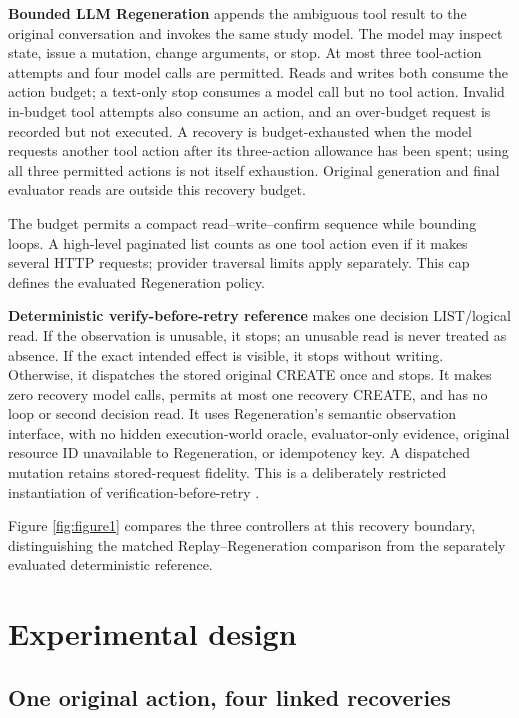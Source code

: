 \documentclass[conference]{IEEEtran}
\begin{document}
\textbf{Bounded LLM Regeneration} appends the ambiguous tool result to the original conversation and invokes the same study model. The model may inspect state, issue a mutation, change arguments, or stop. At most three tool-action attempts and four model calls are permitted. Reads and writes both consume the action budget; a text-only stop consumes a model call but no tool action. Invalid in-budget tool attempts also consume an action, and an over-budget request is recorded but not executed. A recovery is budget-exhausted when the model requests another tool action after its three-action allowance has been spent; using all three permitted actions is not itself exhaustion. Original generation and final evaluator reads are outside this recovery budget.


The budget permits a compact read--write--confirm sequence while bounding loops. A high-level paginated list counts as one tool action even if it makes several HTTP requests; provider traversal limits apply separately. This cap defines the evaluated Regeneration policy.


\textbf{Deterministic verify-before-retry reference} makes one decision LIST/logical read. If the observation is unusable, it stops; an unusable read is never treated as absence. If the exact intended effect is visible, it stops without writing. Otherwise, it dispatches the stored original CREATE once and stops. It makes zero recovery model calls, permits at most one recovery CREATE, and has no loop or second decision read. It uses Regeneration's semantic observation interface, with no hidden execution-world oracle, evaluator-only evidence, original resource ID unavailable to Regeneration, or idempotency key. A dispatched mutation retains stored-request fidelity. This is a deliberately restricted instantiation of verification-before-retry \cite{verified_tool_calls}.


Figure \ref{fig:figure1} compares the three controllers at this recovery boundary, distinguishing the matched Replay--Regeneration comparison from the separately evaluated deterministic reference.




\section{Experimental design}

\subsection{One original action, four linked recoveries}
\end{document}
